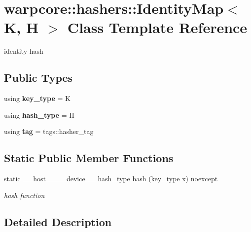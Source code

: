 \hypertarget{classwarpcore_1_1hashers_1_1IdentityMap}{}\section{warpcore\+:\+:hashers\+:\+:Identity\+Map$<$ K, H $>$ Class Template Reference}
\label{classwarpcore_1_1hashers_1_1IdentityMap}


identity hash  


\subsection*{Public Types}
\begin{DoxyCompactItemize}
\item 
\mbox{\label{classwarpcore_1_1hashers_1_1IdentityMap_a99abe762a8cc3c40680331746e5c1e2f}} 
using {\bfseries key\+\_\+type} = K
\item 
\mbox{\label{classwarpcore_1_1hashers_1_1IdentityMap_a1b978a855ad6bbb1e3716fcd96d5f070}} 
using {\bfseries hash\+\_\+type} = H
\item 
\mbox{\label{classwarpcore_1_1hashers_1_1IdentityMap_a37b0f55ff0e51120e58e121685093749}} 
using {\bfseries tag} = tags\+::hasher\+\_\+tag
\end{DoxyCompactItemize}
\subsection*{Static Public Member Functions}
\begin{DoxyCompactItemize}
\item 
static \+\_\+\+\_\+host\+\_\+\+\_\+\+\_\+\+\_\+device\+\_\+\+\_\+ hash\+\_\+type \hyperlink{classwarpcore_1_1hashers_1_1IdentityMap_a916ddad468ba57f3ce81e74c1ef8e57a}{hash} (key\+\_\+type x) noexcept
\begin{DoxyCompactList}\small\item\em hash function \end{DoxyCompactList}\end{DoxyCompactItemize}


\subsection{Detailed Description}
